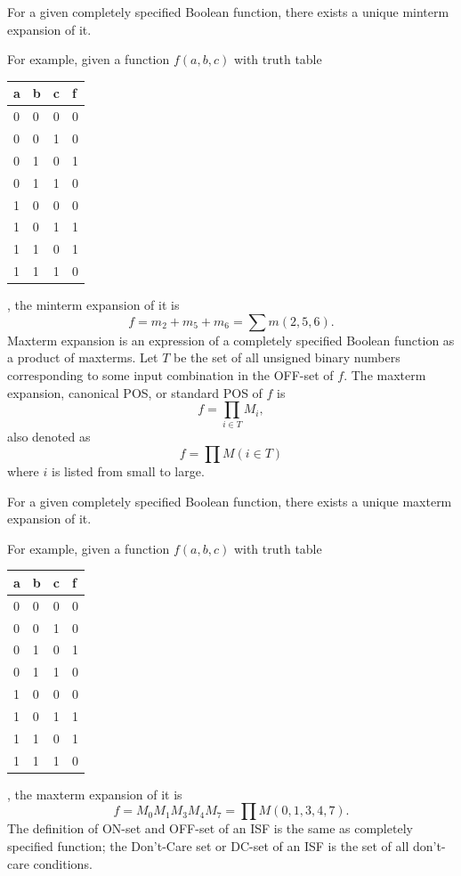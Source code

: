 \documentclass[a4paper,12pt]{article}
\begin{document}
\begin{itemize}
\begin{itemize}
\begin{itemize}
\begin{itemize}
\begin{itemize}
\begin{itemize}
\begin{itemize}
\begin{itemize}
\begin{itemize}
For a given completely specified Boolean function, there exists a unique minterm expansion of it.

For example, given a function $f(a,b,c)$ with truth table
\begin{longtable}[c]{|m|m|m|m|}
\hline
a & b & c & f\\\hline
0 & 0 & 0 & 0\\\hline
0 & 0 & 1 & 0\\\hline
0 & 1 & 0 & 1\\\hline
0 & 1 & 1 & 0\\\hline
1 & 0 & 0 & 0\\\hline
1 & 0 & 1 & 1\\\hline
1 & 1 & 0 & 1\\\hline
1 & 1 & 1 & 0\\\hline
\end{longtable}
, the minterm expansion of it is
\[f=m_2+m_5+m_6=\sum m(2,5,6).\]
Maxterm expansion is an expression of a completely specified Boolean function as a product of maxterms. Let $T$ be the set of all unsigned binary numbers corresponding to some input combination in the OFF-set of $f$. The maxterm expansion, canonical POS, or standard POS of $f$ is
\[f=\prod_{i\in T}M_i,\]
also denoted as 
\[f=\prod M(i\in T)\]
where $i$ is listed from small to large.

For a given completely specified Boolean function, there exists a unique maxterm expansion of it.

For example, given a function $f(a,b,c)$ with truth table
\begin{longtable}[c]{|m|m|m|m|}
\hline
a & b & c & f\\\hline
0 & 0 & 0 & 0\\\hline
0 & 0 & 1 & 0\\\hline
0 & 1 & 0 & 1\\\hline
0 & 1 & 1 & 0\\\hline
1 & 0 & 0 & 0\\\hline
1 & 0 & 1 & 1\\\hline
1 & 1 & 0 & 1\\\hline
1 & 1 & 1 & 0\\\hline
\end{longtable}
, the maxterm expansion of it is
\[f=M_0M_1M_3M_4M_7=\prod M(0,1,3,4,7).\]
The definition of ON-set and OFF-set of an ISF is the same as completely specified function; the Don't-Care set or DC-set of an ISF is the set of all don't-care conditions.


\end{itemize}
\end{itemize}
\end{itemize}
\end{itemize}
\end{itemize}
\end{itemize}
\end{itemize}
\end{itemize}
\end{itemize}
\end{document}

